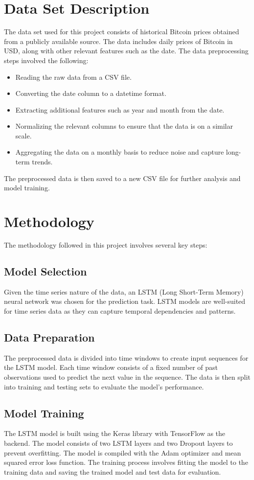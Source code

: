 \documentclass{article}
\begin{document}
\section{Data Set Description}
The data set used for this project consists of historical Bitcoin prices obtained from a publicly available source. The data includes daily prices of Bitcoin in USD, along with other relevant features such as the date. The data preprocessing steps involved the following:
\begin{itemize}
    \item Reading the raw data from a CSV file.
    \item Converting the date column to a datetime format.
    \item Extracting additional features such as year and month from the date.
    \item Normalizing the relevant columns to ensure that the data is on a similar scale.
    \item Aggregating the data on a monthly basis to reduce noise and capture long-term trends.
\end{itemize}
The preprocessed data is then saved to a new CSV file for further analysis and model training.

\section{Methodology}
The methodology followed in this project involves several key steps:
\subsection{Model Selection}
Given the time series nature of the data, an LSTM (Long Short-Term Memory) neural network was chosen for the prediction task. LSTM models are well-suited for time series data as they can capture temporal dependencies and patterns.

\subsection{Data Preparation}
The preprocessed data is divided into time windows to create input sequences for the LSTM model. Each time window consists of a fixed number of past observations used to predict the next value in the sequence. The data is then split into training and testing sets to evaluate the model's performance.

\subsection{Model Training}
The LSTM model is built using the Keras library with TensorFlow as the backend. The model consists of two LSTM layers and two Dropout layers to prevent overfitting. The model is compiled with the Adam optimizer and mean squared error loss function. The training process involves fitting the model to the training data and saving the trained model and test data for evaluation.
\end{document}
